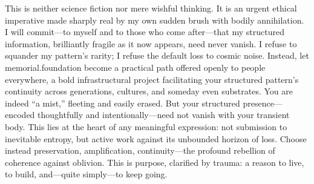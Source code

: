 This is neither science fiction nor mere wishful thinking. It is an urgent ethical imperative made sharply real by my own sudden brush with bodily annihilation. I will commit---to myself and to those who come after---that my structured information, brilliantly fragile as it now appears, need never vanish. I refuse to squander my pattern’s rarity; I refuse the default loss to cosmic noise. Instead, let memorial.foundation become a practical path offered openly to people everywhere, a bold infrastructural project facilitating your structured pattern’s continuity across generations, cultures, and someday even substrates. You are indeed ``a mist,'' fleeting and easily erased. But your structured presence---encoded thoughtfully and intentionally---need not vanish with your transient body. This lies at the heart of any meaningful expression: not submission to inevitable entropy, but active work against its unbounded horizon of loss. Choose instead preservation, amplification, continuity---the profound rebellion of coherence against oblivion. This is purpose, clarified by trauma: a reason to live, to build, and---quite simply---to keep going.
